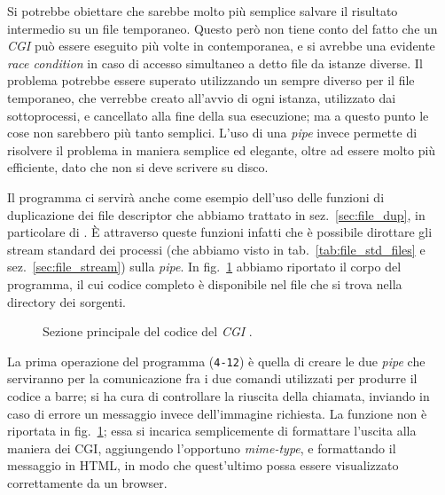 Si potrebbe obiettare che sarebbe molto più semplice salvare il risultato
intermedio su un file temporaneo. Questo però non tiene conto del fatto che un
\textit{CGI} può essere eseguito più volte in contemporanea, e si avrebbe una
evidente \textit{race condition} in caso di accesso simultaneo a detto file da
istanze diverse. Il problema potrebbe essere superato utilizzando un sempre
diverso per il file temporaneo, che verrebbe creato all'avvio di ogni istanza,
utilizzato dai sottoprocessi, e cancellato alla fine della sua esecuzione; ma
a questo punto le cose non sarebbero più tanto semplici.  L'uso di una
\textit{pipe} invece permette di risolvere il problema in maniera semplice ed
elegante, oltre ad essere molto più efficiente, dato che non si deve scrivere
su disco.

Il programma ci servirà anche come esempio dell'uso delle funzioni di
duplicazione dei file descriptor che abbiamo trattato in
sez.~\ref{sec:file_dup}, in particolare di . È attraverso queste
funzioni infatti che è possibile dirottare gli stream standard dei processi
(che abbiamo visto in tab.~\ref{tab:file_std_files} e
sez.~\ref{sec:file_stream}) sulla \textit{pipe}. In
fig.~\ref{fig:ipc_barcodepage_code} abbiamo riportato il corpo del programma,
il cui codice completo è disponibile nel file  che si
trova nella directory dei sorgenti.

\begin{figure}[!htb]
  \footnotesize \centering
  \begin{minipage}[c]{\codesamplewidth}
  \end{minipage} 
  \normalsize 
  \caption{Sezione principale del codice del \textit{CGI} 
    .}
  \label{fig:ipc_barcodepage_code}
\end{figure}

La prima operazione del programma (\texttt{\small 4-12}) è quella di creare
le due \textit{pipe} che serviranno per la comunicazione fra i due comandi
utilizzati per produrre il codice a barre; si ha cura di controllare la
riuscita della chiamata, inviando in caso di errore un messaggio invece
dell'immagine richiesta. La funzione  non è riportata in
fig.~\ref{fig:ipc_barcodepage_code}; essa si incarica semplicemente di
formattare l'uscita alla maniera dei CGI, aggiungendo l'opportuno
\textit{mime-type}, e formattando il messaggio in HTML, in modo che
quest'ultimo possa essere visualizzato correttamente da un browser.

